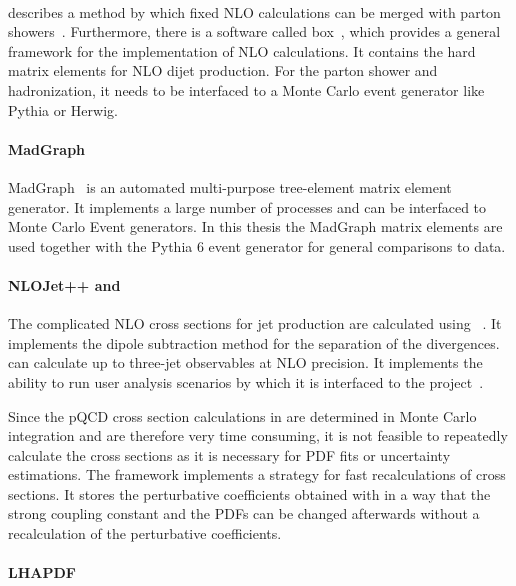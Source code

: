 \paragraph{\powheg}
\powheg describes a method by which fixed NLO calculations can be merged with parton
showers~\cite{Frixione:2007vw,Nason:2004rx}. Furthermore, there is a software called \powheg
box~\cite{Oleari:2010nx}, which provides a
general framework for the implementation of NLO calculations. It contains the
hard matrix elements for NLO dijet production. For the parton shower and
hadronization, it needs to be interfaced to a Monte Carlo event generator like
Pythia or Herwig.

\paragraph{MadGraph}

MadGraph~\cite{Alwall:2011uj} is an automated multi-purpose tree-element matrix
element generator. It implements a large number of processes and can be
interfaced to Monte Carlo Event generators. In this thesis the MadGraph matrix
elements are used together with the Pythia 6 event generator for general
comparisons to data.

\paragraph{NLOJet++ and \fastnlo}
\label{sec:nlojetpp}

The complicated NLO cross sections for jet production are calculated using
\NLOJETPP~\cite{Nagy:2003tz}. It implements the dipole subtraction method for
the separation of the divergences. \NLOJETPP can calculate up to three-jet
observables at NLO precision. It implements the ability to run user analysis scenarios
by which it is interfaced to the \fastnlo project~\cite{Kluge:2006xs,Britzger:2012bs}.

Since the pQCD cross section calculations in \NLOJETPP are determined in Monte
Carlo integration and are therefore very time consuming, it is not feasible to
repeatedly calculate the cross sections as it is necessary for PDF fits or
uncertainty estimations. The \fastnlo framework implements a strategy for fast
recalculations of cross sections. It stores the perturbative coefficients
obtained with \NLOJETPP in a way that the strong coupling constant and the PDFs
can be changed afterwards without a recalculation of the perturbative
coefficients.

\paragraph{LHAPDF}

